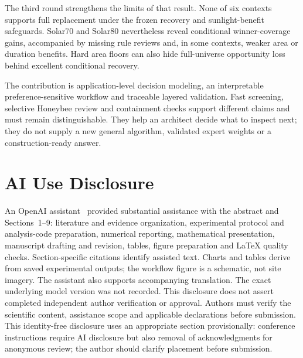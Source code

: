 \documentclass{llncs}
\begin{document}
The third round strengthens the limits of that result. None of six contexts supports full replacement under the frozen recovery and sunlight-benefit safeguards. Solar70 and Solar80 nevertheless reveal conditional winner-coverage gains, accompanied by missing rule reviews and, in some contexts, weaker area or duration benefits. Hard area floors can also hide full-universe opportunity loss behind excellent conditional recovery.

The contribution is application-level decision modeling, an interpretable preference-sensitive workflow and traceable layered validation. Fast screening, selective Honeybee review and containment checks support different claims and must remain distinguishable. They help an architect decide what to inspect next; they do not supply a new general algorithm, validated expert weights or a construction-ready answer.

\section*{AI Use Disclosure}
An OpenAI assistant~\cite{openai2026} provided substantial assistance with the abstract and Sections~1--9: literature and evidence organization, experimental protocol and analysis-code preparation, numerical reporting, mathematical presentation, manuscript drafting and revision, tables, figure preparation and LaTeX quality checks. Section-specific citations identify assisted text. Charts and tables derive from saved experimental outputs; the workflow figure is a schematic, not site imagery. The assistant also supports accompanying translation. The exact underlying model version was not recorded. This disclosure does not assert completed independent author verification or approval. Authors must verify the scientific content, assistance scope and applicable declarations before submission. This identity-free disclosure uses an appropriate section provisionally: conference instructions require AI disclosure but also removal of acknowledgments for anonymous review; the author should clarify placement before submission.
\FloatBarrier

\end{document}
